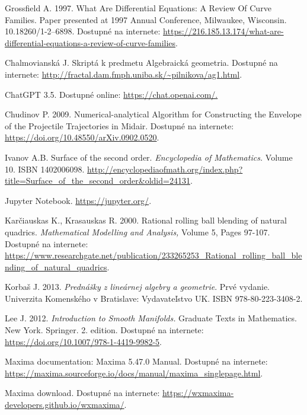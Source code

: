 \documentclass[12pt, twoside]{book}
\theoremstyle{definition}
\begin{document}
\begin{thebibliography}{99}
 Grossfield A. 1997. What Are Differential Equations: A Review Of Curve Families. Paper presented at 1997 Annual Conference, Milwaukee, Wisconsin. 10.18260/1-2--6898. Dostupné na internete: \url{https://216.185.13.174/what-are-differential-equations-a-review-of-curve-families}.


 Chalmovianská J. Skriptá k predmetu Algebraická geometria. Dostupné na internete: \url{http://fractal.dam.fmph.uniba.sk/~pilnikova/ag1.html}.

 ChatGPT 3.5. Dostupné online: \url{https://chat.openai.com/.}

 Chudinov P. 2009. Numerical-analytical Algorithm for Constructing the Envelope of the Projectile Trajectories in Midair. Dostupné na internete: \url{https://doi.org/10.48550/arXiv.0902.0520}.

 Ivanov A.B. Surface of the second order. \textit{Encyclopedia of Mathematics.} Volume 10. ISBN 1402006098. \url{http://encyclopediaofmath.org/index.php?title=Surface_of_the_second_order&oldid=24131}.

 Jupyter Notebook. \url{https://jupyter.org/}.

 Karčiauskas K., Krasauskas R. 2000. Rational rolling ball blending of natural quadrics. \textit{Mathematical Modelling and Analysis,} Volume 5, Pages 97-107. Dostupné na internete: \url{https://www.researchgate.net/publication/233265253_Rational_rolling_ball_blending_of_natural_quadrics}.

 Korbaš J. 2013. \textit{Prednášky z lineárnej algebry a geometrie}. Prvé vydanie. Univerzita Komenského v Bratislave: Vydavateľstvo UK.  ISBN 978-80-223-3408-2.

 Lee J. 2012. \textit{Introduction to Smooth Manifolds.} Graduate Texts in Mathematics. New York. Springer. 2. edition. Dostupné na internete: \url{https://doi.org/10.1007/978-1-4419-9982-5}.

 Maxima documentation: Maxima 5.47.0 Manual. Dostupné na internete: \url{https://maxima.sourceforge.io/docs/manual/maxima_singlepage.html}.

 Maxima download. Dostupné na internete: \url{https://wxmaxima-developers.github.io/wxmaxima/}.


\end{thebibliography}
\end{document}
